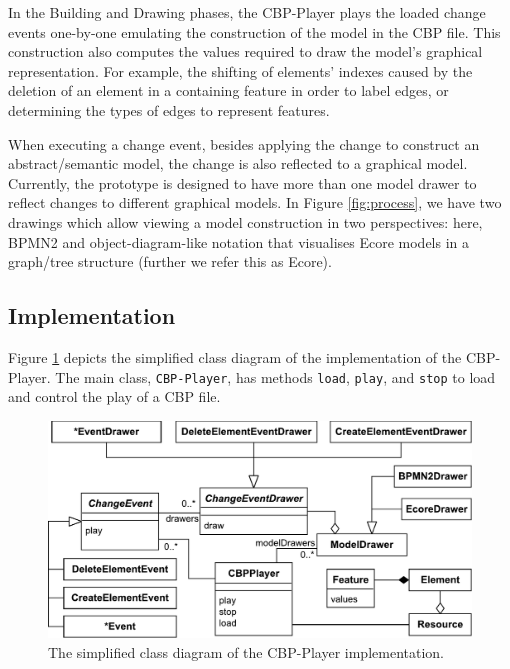 \documentclass[conference]{IEEEtran}
\begin{document}
In the Building and Drawing phases, the CBP-Player plays the loaded change events one-by-one emulating the construction of the model in the CBP file.
This construction also computes the values required to draw the model's graphical representation.
For example, the shifting of elements' indexes caused by the deletion of an element in a containing feature
in order to label edges, or determining the types of edges to represent features. 

When executing a change event, besides applying the change to construct an abstract/semantic model, 
the change is also reflected to a graphical model. Currently, 
the prototype is designed to have more than one model drawer to reflect changes to different graphical models. 
In Figure \ref{fig:process}, we have two drawings 
which allow viewing a model construction in two perspectives: here, BPMN2 and 
object-diagram-like notation that visualises Ecore models in a graph/tree structure 
(further we refer this as Ecore).

\subsection{Implementation}
\label{sec:implementation}
Figure \ref{fig:class_diagram} depicts the simplified class diagram 
of the implementation of the CBP-Player. The main class, \texttt{CBP-Player}, has methods \texttt{load},
\texttt{play}, and \texttt{stop} to load and control the play of a CBP file.

\begin{figure}[h]
    \includegraphics[width=\linewidth]{class_diagram}
    \caption{The simplified class diagram of the CBP-Player implementation.}
    \label{fig:class_diagram}
\end{figure}
\end{document}

